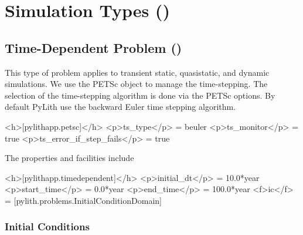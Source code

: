 \section{Simulation Types (\protect{})}

\subsection{Time-Dependent Problem (\protect{})}

This type of problem applies to transient static, quasistatic, and
dynamic simulations. We use the PETSc  object to manage the
time-stepping. The selection of the time-stepping algorithm is done
via the PETSc options. By default PyLith use the backward Euler time
stepping algorithm.

\begin{cfg}
<h>[pylithapp.petsc]</h>
<p>ts_type</p> = beuler
<p>ts_monitor</p> = true
<p>ts_error_if_step_fails</p> = true
\end{cfg}

The  properties and facilities include
\begin{inventory}
\end{inventory}

\begin{cfg}
<h>[pylithapp.timedependent]</h>
<p>initial_dt</p> = 10.0*year
<p>start_time</p> = 0.0*year
<p>end_time</p> = 100.0*year
<f>ic</f> = [pylith.problems.InitialConditionDomain]
\end{cfg}


\subsubsection{Initial Conditions}


